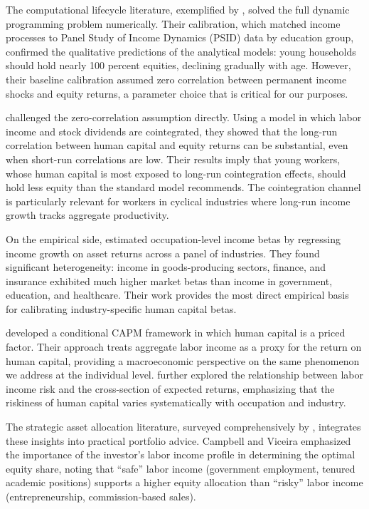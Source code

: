 \documentclass[11pt]{article}
\begin{document}
The computational lifecycle literature, exemplified by
\citet{cocco2005}, solved the full dynamic programming problem
numerically. Their calibration, which matched income processes to Panel
Study of Income Dynamics (PSID) data by education group, confirmed the
qualitative predictions of the analytical models: young households should
hold nearly 100 percent equities, declining gradually with age. However,
their baseline calibration assumed zero correlation between permanent income
shocks and equity returns, a parameter choice that is critical for our
purposes.

\citet{benzoni2007} challenged the zero-correlation assumption directly.
Using a model in which labor income and stock dividends are cointegrated,
they showed that the long-run correlation between human capital and equity
returns can be substantial, even when short-run correlations are low. Their
results imply that young workers, whose human capital is most exposed to
long-run cointegration effects, should hold less equity than the standard
model recommends. The cointegration channel is particularly relevant for
workers in cyclical industries where long-run income growth tracks
aggregate productivity.

On the empirical side, \citet{davis2000} estimated occupation-level income
betas by regressing income growth on asset returns across a panel of
industries. They found significant heterogeneity: income in goods-producing
sectors, finance, and insurance exhibited much higher market betas than
income in government, education, and healthcare. Their work provides the
most direct empirical basis for calibrating industry-specific human capital
betas.

\citet{jagannathan1996} developed a conditional CAPM framework in which
human capital is a priced factor. Their approach treats aggregate labor
income as a proxy for the return on human capital, providing a
macroeconomic perspective on the same phenomenon we address at the
individual level. \citet{campbell1996} further explored the relationship
between labor income risk and the cross-section of expected returns,
emphasizing that the riskiness of human capital varies systematically with
occupation and industry.

The strategic asset allocation literature, surveyed comprehensively by
\citet{campbell2002}, integrates these insights into practical portfolio
advice. Campbell and Viceira emphasized the importance of the
investor's labor income profile in determining the optimal equity share,
noting that ``safe'' labor income (government employment, tenured academic
positions) supports a higher equity allocation than ``risky'' labor income
(entrepreneurship, commission-based sales).
\end{document}
